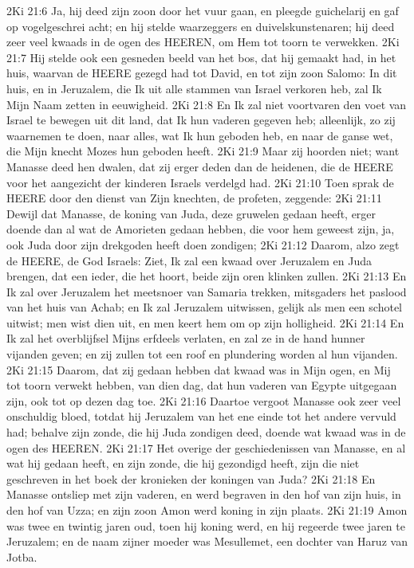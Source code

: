 2Ki 21:6  Ja, hij deed zijn zoon door het vuur gaan, en pleegde guichelarij en gaf op vogelgeschrei acht; en hij stelde waarzeggers en duivelskunstenaren; hij deed zeer veel kwaads in de ogen des HEEREN, om Hem tot toorn te verwekken.
2Ki 21:7  Hij stelde ook een gesneden beeld van het bos, dat hij gemaakt had, in het huis, waarvan de HEERE gezegd had tot David, en tot zijn zoon Salomo: In dit huis, en in Jeruzalem, die Ik uit alle stammen van Israel verkoren heb, zal Ik Mijn Naam zetten in eeuwigheid.
2Ki 21:8  En Ik zal niet voortvaren den voet van Israel te bewegen uit dit land, dat Ik hun vaderen gegeven heb; alleenlijk, zo zij waarnemen te doen, naar alles, wat Ik hun geboden heb, en naar de ganse wet, die Mijn knecht Mozes hun geboden heeft.
2Ki 21:9  Maar zij hoorden niet; want Manasse deed hen dwalen, dat zij erger deden dan de heidenen, die de HEERE voor het aangezicht der kinderen Israels verdelgd had.
2Ki 21:10  Toen sprak de HEERE door den dienst van Zijn knechten, de profeten, zeggende:
2Ki 21:11  Dewijl dat Manasse, de koning van Juda, deze gruwelen gedaan heeft, erger doende dan al wat de Amorieten gedaan hebben, die voor hem geweest zijn, ja, ook Juda door zijn drekgoden heeft doen zondigen;
2Ki 21:12  Daarom, alzo zegt de HEERE, de God Israels: Ziet, Ik zal een kwaad over Jeruzalem en Juda brengen, dat een ieder, die het hoort, beide zijn oren klinken zullen.
2Ki 21:13  En Ik zal over Jeruzalem het meetsnoer van Samaria trekken, mitsgaders het paslood van het huis van Achab; en Ik zal Jeruzalem uitwissen, gelijk als men een schotel uitwist; men wist dien uit, en men keert hem om op zijn holligheid.
2Ki 21:14  En Ik zal het overblijfsel Mijns erfdeels verlaten, en zal ze in de hand hunner vijanden geven; en zij zullen tot een roof en plundering worden al hun vijanden.
2Ki 21:15  Daarom, dat zij gedaan hebben dat kwaad was in Mijn ogen, en Mij tot toorn verwekt hebben, van dien dag, dat hun vaderen van Egypte uitgegaan zijn, ook tot op dezen dag toe.
2Ki 21:16  Daartoe vergoot Manasse ook zeer veel onschuldig bloed, totdat hij Jeruzalem van het ene einde tot het andere vervuld had; behalve zijn zonde, die hij Juda zondigen deed, doende wat kwaad was in de ogen des HEEREN.
2Ki 21:17  Het overige der geschiedenissen van Manasse, en al wat hij gedaan heeft, en zijn zonde, die hij gezondigd heeft, zijn die niet geschreven in het boek der kronieken der koningen van Juda?
2Ki 21:18  En Manasse ontsliep met zijn vaderen, en werd begraven in den hof van zijn huis, in den hof van Uzza; en zijn zoon Amon werd koning in zijn plaats.
2Ki 21:19  Amon was twee en twintig jaren oud, toen hij koning werd, en hij regeerde twee jaren te Jeruzalem; en de naam zijner moeder was Mesullemet, een dochter van Haruz van Jotba.

